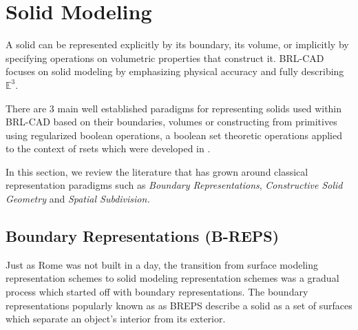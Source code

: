 \clearpage


\section{Solid Modeling}

\hspace{30} A solid can be represented explicitly by its boundary, its volume, or
implicitly by specifying operations on volumetric properties that construct it.
BRL-­CAD focuses on solid modeling by emphasizing physical accuracy and
fully describing $\mathbb{E}^3$.

There are 3 main well­ established paradigms for representing solids used
within BRL-­CAD based on their boundaries, volumes or constructing from
primitives using regularized boolean operations, a boolean set theoretic
operations applied to the context of r­sets which were developed in \cite{4}.

In this section, we review the literature that has grown around classical
representation paradigms such as \textit{Boundary   Representations}, \textit{Constructive  
Solid Geometry} and \textit{Spatial Subdivision.}

\subsection{Boundary Representations (B-REPS)}

\hspace{30} Just as Rome was not built in a day, the transition from surface modeling
representation schemes   to   solid   modeling   representation   schemes   was   a  
gradual   process   which   started   off   with   boundary   representations.   The   boundary  
representations   popularly   known   as   as   B­REPS   describe   a   solid   as   a   set   of  
surfaces which separate an object's interior from its exterior. 

